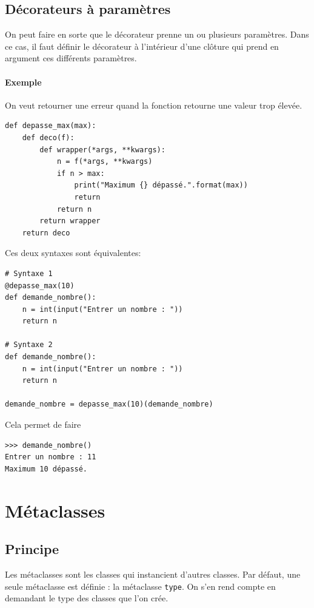 \documentclass[a4paper, 10pt]{article}
\begin{document}
\subsection{Décorateurs à paramètres}
On peut faire en sorte que le décorateur prenne un ou plusieurs paramètres. Dans ce cas, il faut définir le décorateur à l'intérieur d'une clôture qui prend en argument ces différents paramètres.

\paragraph{Exemple} On veut retourner une erreur quand la fonction retourne une valeur trop élevée.
\begin{verbatim}
def depasse_max(max):
    def deco(f):
        def wrapper(*args, **kwargs):
            n = f(*args, **kwargs)
            if n > max:
                print("Maximum {} dépassé.".format(max))
                return
            return n
        return wrapper
    return deco
\end{verbatim}

Ces deux syntaxes sont équivalentes:

\begin{verbatim}
# Syntaxe 1
@depasse_max(10)
def demande_nombre():
    n = int(input("Entrer un nombre : "))
    return n

# Syntaxe 2
def demande_nombre():
    n = int(input("Entrer un nombre : "))
    return n

demande_nombre = depasse_max(10)(demande_nombre)
\end{verbatim}

Cela permet de faire

\begin{verbatim}
>>> demande_nombre()
Entrer un nombre : 11
Maximum 10 dépassé.
\end{verbatim}

\section{Métaclasses}
\subsection{Principe}
\label{sec:metaclasses}
Les métaclasses sont les classes qui instancient d'autres classes. Par défaut, une seule métaclasse est définie : la métaclasse \texttt{type}. On s'en rend compte en demandant le type des classes que l'on crée.
\end{document}
